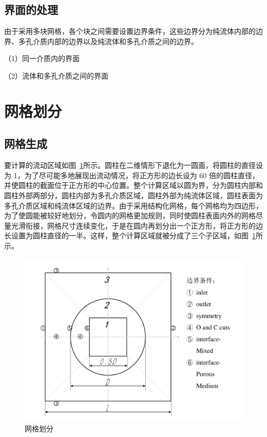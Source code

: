 \subsection{界面的处理}

由于采用多块网格，各个块之间需要设置边界条件，这些边界分为纯流体内部的边界、多孔介质内部的边界以及纯流体和多孔介质之间的边界。

（1）同一介质内的界面

（2）流体和多孔介质之间的界面

\section{网格划分}

\subsection{网格生成}

要计算的流动区域如图~\ref{fig: grid}所示。圆柱在二维情形下退化为一圆面，将圆柱的直径设为 1，为了尽可能多地展现出流动情况，将正方形的边长设为 60 倍的圆柱直径，并使圆柱的截面位于正方形的中心位置。整个计算区域以圆为界，分为圆柱内部和圆柱外部两部分，圆柱内部为多孔介质区域，圆柱外部为纯流体区域，圆柱表面为多孔介质区域和纯流体区域的边界。由于采用结构化网格，每个网格均为四边形，为了使圆能被较好地划分，令圆内的网格更加规则，同时使圆柱表面内外的网格尽量光滑衔接，网格尺寸连续变化，于是在圆内再划分出一个正方形，将正方形的边长设置为圆柱直径的一半。这样，整个计算区域就被分成了三个子区域，如图~\ref{fig: grid}所示。

\begin{figure}
	\centering
	\includegraphics[scale=.6]{figs/grid}
	\caption{网格划分}\label{fig: grid}
\end{figure}

